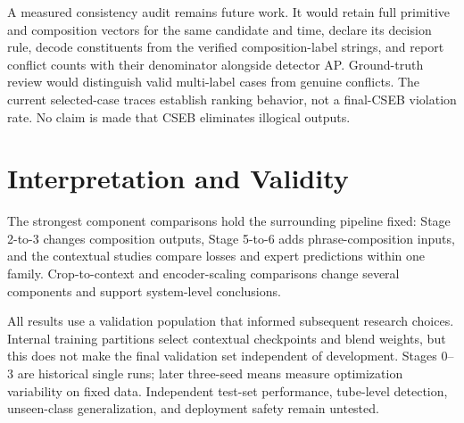 A measured consistency audit remains future work. It would retain full primitive and composition vectors for the same candidate and time, declare its decision rule, decode constituents from the verified composition-label strings, and report conflict counts with their denominator alongside detector AP. Ground-truth review would distinguish valid multi-label cases from genuine conflicts. The current selected-case traces establish ranking behavior, not a final-CSEB violation rate. No claim is made that CSEB eliminates illogical outputs.

\section{Interpretation and Validity}

The strongest component comparisons hold the surrounding pipeline fixed: Stage 2-to-3 changes composition outputs, Stage 5-to-6 adds phrase-composition inputs, and the contextual studies compare losses and expert predictions within one family. Crop-to-context and encoder-scaling comparisons change several components and support system-level conclusions.

All results use a validation population that informed subsequent research choices. Internal training partitions select contextual checkpoints and blend weights, but this does not make the final validation set independent of development. Stages 0--3 are historical single runs; later three-seed means measure optimization variability on fixed data. Independent test-set performance, tube-level detection, unseen-class generalization, and deployment safety remain untested.
